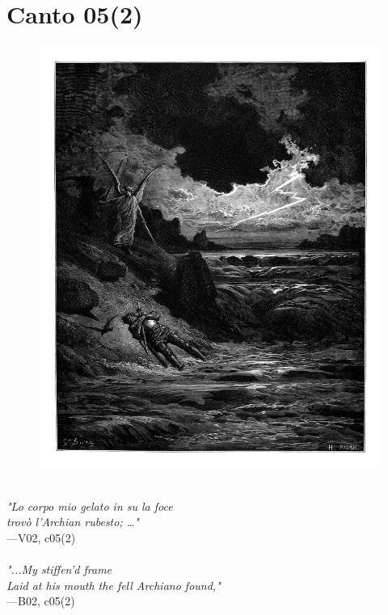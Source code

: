 \documentclass[../Dore_vision.tex]{subfiles}
\begin{document}
\newpage

\section{Canto 05(2)}

\begin{figure}[ht]
\centering
\includegraphics[height=\figsize]{illustrations/book_2/V02, c05(2).jpg}
\end{figure}

\begin{center}
\begin{minipage}{0.8\linewidth}
\textit{\\
"Lo corpo mio gelato in su la foce\\trov\`o l’Archian rubesto; …"} \\
—V02, c05(2) \\~\\
\textit{"...My stiffen'd frame\\Laid at his mouth the fell Archiano found,"} \\
—B02, c05(2)
\end{minipage}
\end{center}
\end{document}
